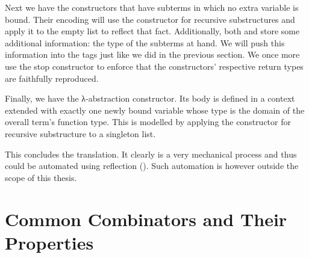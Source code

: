 Next we have the constructors that have subterms in which no extra variable
is bound. Their encoding will use the constructor for recursive substructures
and apply it to the empty list to reflect that fact. Additionally, both
 and  store some additional information: the type of
the subterms at hand. We will push this information into the tags just like
we did in the previous section. We once more use the stop constructor to
enforce that the constructors' respective return types are faithfully
reproduced.

\noindent\begin{minipage}[t]{0.4\textwidth}
\end{minipage}\begin{minipage}[t]{0.6\textwidth}
  \begin{AgdaSuppressSpace}
  \end{AgdaSuppressSpace}
\end{minipage}

Finally, we have the λ-abstraction constructor. Its body is defined in
a context extended with exactly one newly bound variable whose type is
the domain of the overall term's function type. This is modelled by
applying the constructor for recursive substructure to a singleton list.

\noindent\begin{minipage}[t]{0.4\textwidth}
\end{minipage}\begin{minipage}[t]{0.6\textwidth}
  \begin{AgdaSuppressSpace}
  \end{AgdaSuppressSpace}
\end{minipage}

This concludes the translation. It clearly is a very mechanical process
and thus could be automated using reflection
(\cite{DBLP:conf/ifl/WaltS12,thesis:christiansen}). Such automation is however
outside the scope of this thesis.

\section{Common Combinators and Their Properties}
\label{desccomb}

